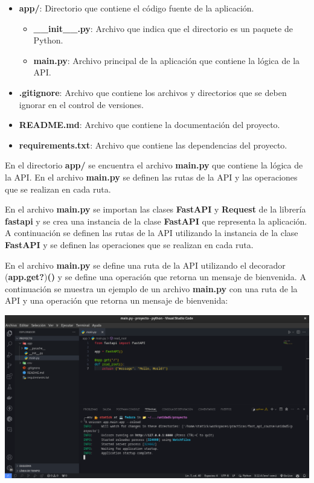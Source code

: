 \documentclass[
  a4paper,
  DIV=11,
  numbers=noendperiod,
  onepage,
  openany]{scrreprt}
\providecommand{\tightlist}{%
  \setlength{\itemsep}{0pt}\setlength{\parskip}{0pt}}\usepackage{longtable,booktabs,array}
\begin{document}
\begin{itemize}
\tightlist
\item
  \textbf{app/}: Directorio que contiene el código fuente de la
  aplicación.

  \begin{itemize}
  \tightlist
  \item
    \textbf{\_\_init\_\_.py}: Archivo que indica que el directorio es un
    paquete de Python.
  \item
    \textbf{main.py}: Archivo principal de la aplicación que contiene la
    lógica de la API.
  \end{itemize}
\item
  \textbf{.gitignore}: Archivo que contiene los archivos y directorios
  que se deben ignorar en el control de versiones.
\item
  \textbf{README.md}: Archivo que contiene la documentación del
  proyecto.
\item
  \textbf{requirements.txt}: Archivo que contiene las dependencias del
  proyecto.
\end{itemize}

En el directorio \textbf{app/} se encuentra el archivo \textbf{main.py}
que contiene la lógica de la API. En el archivo \textbf{main.py} se
definen las rutas de la API y las operaciones que se realizan en cada
ruta.

En el archivo \textbf{main.py} se importan las clases \textbf{FastAPI} y
\textbf{Request} de la librería \textbf{fastapi} y se crea una instancia
de la clase \textbf{FastAPI} que representa la aplicación. A
continuación se definen las rutas de la API utilizando la instancia de
la clase \textbf{FastAPI} y se definen las operaciones que se realizan
en cada ruta.

En el archivo \textbf{main.py} se define una ruta de la API utilizando
el decorador (\textbf{app.get?})\textbf{()} y se define una operación
que retorna un mensaje de bienvenida. A continuación se muestra un
ejemplo de un archivo \textbf{main.py} con una ruta de la API y una
operación que retorna un mensaje de bienvenida:

\includegraphics{unidades/unidad5/images/paste-16.png}
\end{document}
